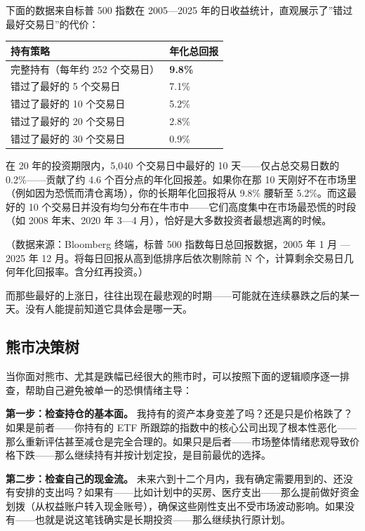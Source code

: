 \documentclass[a4paper,11pt,oneside,fontset=none,UTF8,zihao=-4]{ctexbook}
\begin{document}
下面的数据来自标普 500 指数在 2005---2025
年的日收益统计，直观展示了''错过最好交易日''的代价：

\begin{longtable}[]{@{}ll@{}}
\toprule\noalign{}\rowcolor{dh-pink!25}
持有策略 & 年化总回报 \\
\midrule\noalign{}
\endhead
\bottomrule\noalign{}
\endlastfoot
完整持有（每年约 252 个交易日） & \textbf{9.8\%} \\
错过了最好的 5 个交易日 & 7.1\% \\
错过了最好的 10 个交易日 & 5.2\% \\
错过了最好的 20 个交易日 & 2.8\% \\
错过了最好的 30 个交易日 & 0.9\% \\
\end{longtable}

在 20 年的投资期限内，5,040 个交易日中最好的 10 天------仅占总交易日数的
0.2\%------贡献了约 4.6 个百分点的年化回报差。如果你在那 10
天刚好不在市场里（例如因为恐慌而清仓离场），你的长期年化回报将从 9.8\%
腰斩至 5.2\%。而这最好的 10
个交易日并没有均匀分布在牛市中------它们高度集中在市场最恐慌的时段（如
2008 年末、2020 年 3---4 月），恰好是大多数投资者最想逃离的时候。

（数据来源：Bloomberg 终端，标普 500 指数每日总回报数据，2005 年 1 月
--- 2025 年 12 月。将每日回报从高到低排序后依次剔除前 N
个，计算剩余交易日几何年化回报率。含分红再投资。）

而那些最好的上涨日，往往出现在最悲观的时期------可能就在连续暴跌之后的某一天。没有人能提前知道它具体会是哪一天。

\subsection{熊市决策树}\label{ux718aux5e02ux51b3ux7b56ux6811}

当你面对熊市、尤其是跌幅已经很大的熊市时，可以按照下面的逻辑顺序逐一排查，帮助自己避免被单一的恐惧情绪主导：

\textbf{第一步：检查持仓的基本面。}
我持有的资产本身变差了吗？还是只是价格跌了？如果是前者------你持有的 ETF
所跟踪的指数中的核心公司出现了根本性恶化------那么重新评估甚至减仓是完全合理的。如果只是后者------市场整体情绪悲观导致价格下跌------那么继续持有并按计划定投，是目前最优的选择。

\textbf{第二步：检查自己的现金流。}
未来六到十二个月内，我有确定需要用到的、还没有安排的支出吗？如果有------比如计划中的买房、医疗支出------那么提前做好资金划拨（从权益账户转入现金账号），确保这些刚性支出不受市场波动影响。如果没有------也就是说这笔钱确实是长期投资------那么继续执行原计划。
\end{document}
